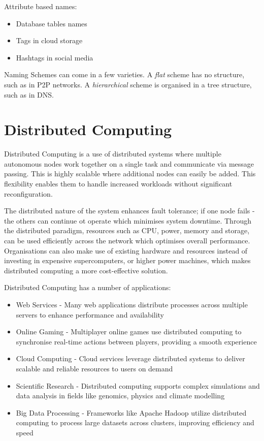 Attribute based names:
\begin{itemize}
    \item Database tables names
    \item Tags in cloud storage
    \item Hashtags in social media
\end{itemize}

Naming Schemes can come in a few varieties. A \textit{flat} scheme has no structure, such as in P2P networks. A \textit{hierarchical} scheme is organised in a tree structure, such as in DNS.

\section{Distributed Computing}
Distributed Computing is a use of distributed systems where multiple autonomous nodes work together on a single task and communicate via message passing. This is highly scalable where additional nodes can easily be added. This flexibility enables them to handle increased workloads without significant reconfiguration. 

The distributed nature of the system enhances fault tolerance; if one node fails - the others can continue ot operate which minimises system downtime. Through the distributed paradigm, resources such as CPU, power, memory and storage, can be used efficiently across the network which optimises overall performance. Organisations can also make use of existing hardware and resources instead of investing in expensive supercomputers, or higher power machines, which makes distributed computing a more cost-effective solution. 

Distributed Computing has a number of applications:
\begin{itemize}
    \item Web Services - Many web applications distribute processes across multiple servers to enhance performance and availability
    \item Online Gaming - Multiplayer online games use distributed computing to synchronise real-time actions between players, providing a smooth experience
    \item Cloud Computing - Cloud services leverage distributed systems to deliver scalable and reliable resources to users on demand
    \item Scientific Research - Distributed computing supports complex simulations and data analysis in fields like genomics, physics and climate modelling
    \item Big Data Processing - Frameworks like Apache Hadoop utilize distributed computing to process large datasets across clusters, improving efficiency and speed
\end{itemize}

